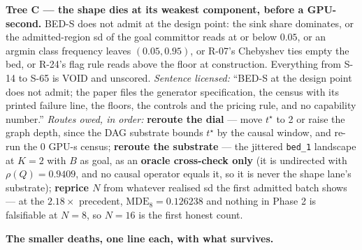\documentclass[11pt,a4paper]{article}
\theoremstyle{plain}
\theoremstyle{definition}
\theoremstyle{remark}
\begin{document}
\textbf{Tree C --- the shape dies at its weakest component, before a
GPU-second.} BED-S does not admit at the design point: the sink share
dominates, or the admitted-region sd of the goal committor reads at or
below \(0.05\), or an argmin class frequency leaves \((0.05,0.95)\), or
R-07's Chebyshev ties empty the bed, or R-24's flag rule reads above the
floor at construction. Everything from S-14 to S-65 is VOID and
unscored. \emph{Sentence licensed:} ``BED-S at the design point does not
admit; the paper files the generator specification, the census with its
printed failure line, the floors, the controls and the pricing rule, and
no capability number.'' \emph{Routes owed, in order:} \textbf{reroute
the dial} --- move \(t^\star\) to 2 or raise the graph depth, since the
DAG substrate bounds \(t^\star\) by the causal window, and re-run the
\(0\) GPU-s census; \textbf{reroute the substrate} --- the jittered
\texttt{bed\_1} landscape at \(K=2\) with \(B\) as goal, as an
\textbf{oracle cross-check only} (it is undirected with
\(\rho(Q)=0.9409\), and no causal operator equals it, so it is never the
shape lane's substrate); \textbf{reprice \(N\)} from whatever realised
sd the first admitted batch shows --- at the \(2.18\times\) precedent,
\(\mathrm{MDE}_8=0.126238\) and nothing in Phase 2 is falsifiable at
\(N=8\), so \(N=16\) is the first honest count.

\textbf{The smaller deaths, one line each, with what survives.}
\end{document}
